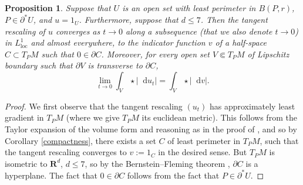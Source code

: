 \documentclass[reqno,10pt]{amsart}
\newcommand{\RR}{\mathbf{R}}
\newcommand*\dif{\mathop{}\!\mathrm{d}}
\newcommand{\loc}{\mathrm{loc}}
\newcommand{\cpt}{\mathrm{cpt}}
\newtheorem{proposition}[theorem]{Proposition}
\theoremstyle{definition}
\numberwithin{equation}{section}
\begin{document}
\begin{proposition}\label{blowup theorem}
Suppose that $U$ is an open set with least perimeter in $B(P, r)$, $P \in \partial^* U$, and $u = 1_U$.
Furthermore, suppose that $d \leq 7$.
Then the tangent rescaling of $u$ converges as $t \to 0$ along a subsequence (that we also denote $t \to 0$) in $L^1_\loc$ and almost everywhere, to the indicator function $v$ of a half-space $C \subset T_PM$ such that $0 \in \partial C$.
Moreover, for every open set $V \Subset T_PM$ of Lipschitz boundary such that $\partial V$ is transverse to $\partial C$,
$$\lim_{t \to 0} \int_V \star |\dif u_t| = \int_V \star |\dif v|.$$
\end{proposition}
\begin{proof}
We first observe that the tangent rescaling $(u_t)$ has approximately least gradient in $T_PM$ (where we give $T_PM$ its euclidean metric).
This follows from the Taylor expansion of the volume form and reasoning as in the proof of \cite[Theorem 9.3]{Giusti77}, and so by Corollary \ref{compactness}, there exists a set $C$ of least perimeter in $T_PM$, such that the tangent rescaling converges to $v := 1_C$ in the desired sense.
But $T_PM$ is isometric to $\RR^d$, $d \leq 7$, so by the Bernstein--Fleming theorem \cite[Theorem 17.3]{Giusti77}, $\partial C$ is a hyperplane.
The fact that $0 \in \partial C$ follows from the fact that $P \in \partial^* U$.
\end{proof}
\end{document}
